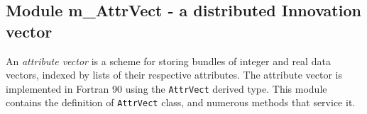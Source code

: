  
\parskip        0pt
\parindent      0pt
\baselineskip  11pt
 
\def\bv{\begin{verbatim}}
\def\ev{\end{verbatim}}
\def\be{\begin{equation}}
\def\ee{\end{equation}}
\def\bea{\begin{eqnarray}}
\def\eea{\end{eqnarray}}
\def\bi{\begin{itemize}}
\def\ei{\end{itemize}}
\def\bn{\begin{enumerate}}
\def\en{\end{enumerate}}
\def\bd{\begin{description}}
\def\ed{\end{description}}
\def\({\left (}
\def\){\right )}
\def\[{\left [}
\def\]{\right ]}
\def\<{\left  \langle}
\def\>{\right \rangle}
\def\cI{{\cal I}}
\def\diag{\mathop{\rm diag}}
\def\tr{\mathop{\rm tr}}
 

 \subsection{Module m\_AttrVect - a distributed Innovation vector}


 
 
  An {\em attribute vector} is a scheme for storing bundles of integer 
  and real data vectors, indexed by lists of their respective attributes.
  The attribute vector is implemented in Fortran 90 using the 
  {\tt AttrVect} derived type.  This module contains the definition of
  {\tt AttrVect} class, and numerous methods that service it.
 

